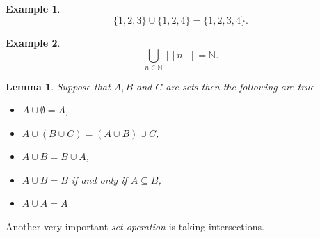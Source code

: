 \documentclass[
]{book}
\newtheorem{lemma}{Lemma}[chapter]
\theoremstyle{definition}
\theoremstyle{definition}
\newtheorem{example}{Example}[chapter]
\theoremstyle{definition}
\theoremstyle{definition}
\theoremstyle{remark}
\begin{document}
\begin{example}
\[ \{1,2,3\} \cup \{ 1,2, 4\} = \{1,2,3,4\}.\]
\end{example}

\begin{example}
\[ \bigcup_{n \in \mathbb{N}} [[n]] = \mathbb{N}. \]
\end{example}

\begin{lemma}

Suppose that \(A, B\) and \(C\) are sets then the following are true

\begin{itemize}
\item
  \(A \cup \emptyset = A\),
\item
  \(A \cup (B \cup C) = (A \cup B)\cup C\),
\item
  \(A \cup B = B \cup A\),
\item
  \(A \cup B = B\) if and only if \(A \subseteq B\),
\item
  \(A \cup A = A\)
\end{itemize}

\end{lemma}

Another very important \emph{set operation} is taking intersections.
\end{document}
